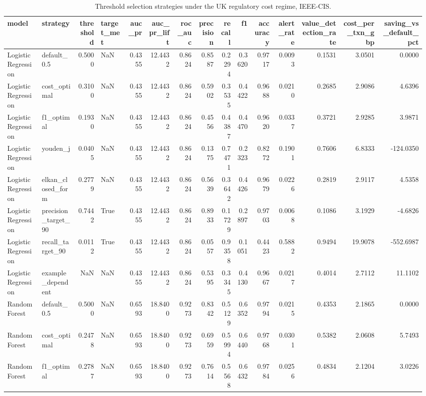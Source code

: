 \begin{table}
\caption{Threshold selection strategies under the UK regulatory cost regime, IEEE-CIS.}
\label{tab:table1_main_results}
\begin{tabular}{llrlrrrrrrrrrrr}
\toprule
model & strategy & threshold & target\_met & auc\_pr & auc\_pr\_lift & roc\_auc & precision & recall & f1 & accuracy & alert\_rate & value\_detection\_rate & cost\_per\_txn\_gbp & saving\_vs\_default\_pct \\
\midrule
Logistic Regression & default\_0.5 & 0.5000 & NaN & 0.4355 & 12.4432 & 0.8624 & 0.8587 & 0.2294 & 0.3620 & 0.9717 & 0.0093 & 0.1531 & 3.0501 & 0.0000 \\
Logistic Regression & cost\_optimal & 0.3100 & NaN & 0.4355 & 12.4432 & 0.8624 & 0.5902 & 0.3535 & 0.4422 & 0.9688 & 0.0210 & 0.2685 & 2.9086 & 4.6396 \\
Logistic Regression & f1\_optimal & 0.1930 & NaN & 0.4355 & 12.4432 & 0.8624 & 0.4556 & 0.4387 & 0.4470 & 0.9620 & 0.0337 & 0.3721 & 2.9285 & 3.9871 \\
Logistic Regression & youden\_j & 0.0405 & NaN & 0.4355 & 12.4432 & 0.8624 & 0.1375 & 0.7471 & 0.2323 & 0.8272 & 0.1901 & 0.7606 & 6.8333 & -124.0350 \\
Logistic Regression & elkan\_closed\_form & 0.2779 & NaN & 0.4355 & 12.4432 & 0.8624 & 0.5639 & 0.3642 & 0.4426 & 0.9679 & 0.0226 & 0.2819 & 2.9117 & 4.5358 \\
Logistic Regression & precision\_target\_90 & 0.7442 & True & 0.4355 & 12.4432 & 0.8624 & 0.8933 & 0.1729 & 0.2897 & 0.9703 & 0.0068 & 0.1086 & 3.1929 & -4.6826 \\
Logistic Regression & recall\_target\_90 & 0.0112 & True & 0.4355 & 12.4432 & 0.8624 & 0.0557 & 0.9358 & 0.1051 & 0.4423 & 0.5882 & 0.9494 & 19.9078 & -552.6987 \\
Logistic Regression & example\_dependent & NaN & NaN & 0.4355 & 12.4432 & 0.8624 & 0.5395 & 0.3345 & 0.4130 & 0.9667 & 0.0217 & 0.4014 & 2.7112 & 11.1102 \\
Random Forest & default\_0.5 & 0.5000 & NaN & 0.6593 & 18.8400 & 0.9273 & 0.8342 & 0.5129 & 0.6352 & 0.9794 & 0.0215 & 0.4353 & 2.1865 & 0.0000 \\
Random Forest & cost\_optimal & 0.2478 & NaN & 0.6593 & 18.8400 & 0.9273 & 0.6959 & 0.5994 & 0.6440 & 0.9768 & 0.0301 & 0.5382 & 2.0608 & 5.7493 \\
Random Forest & f1\_optimal & 0.2787 & NaN & 0.6593 & 18.8400 & 0.9273 & 0.7614 & 0.5568 & 0.6432 & 0.9784 & 0.0256 & 0.4834 & 2.1204 & 3.0226 \\

\end{tabular}
\end{table}
